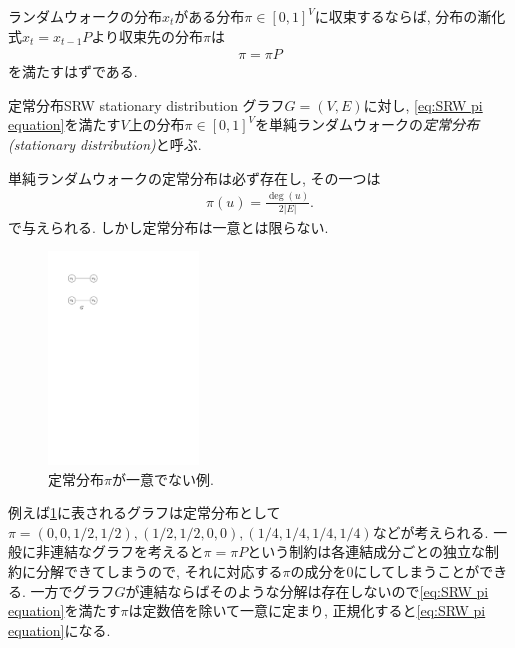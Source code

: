 ランダムウォークの分布$x_t$がある分布$\pi\in[0,1]^V$に収束するならば, 分布の漸化式$x_t = x_{t-1}P$より収束先の分布$\pi$は
\begin{align}
  \pi = \pi P \label{eq:SRW pi equation}
\end{align}
を満たすはずである.
%
\begin{definition}{定常分布}{SRW stationary distribution}
  グラフ$G=(V,E)$に対し, \cref{eq:SRW pi equation}を満たす$V$上の分布$\pi\in[0,1]^V$を単純ランダムウォークの\emph{定常分布 (stationary distribution)}と呼ぶ.
\end{definition}
%
単純ランダムウォークの定常分布は必ず存在し, その一つは
\begin{align}
  \pi(u) = \frac{\deg(u)}{2|E|}. \label{eq:SRW stationary distribution}
\end{align}
で与えられる.
しかし定常分布は一意とは限らない.
\begin{figure}
  \begin{center}
  \includegraphics[width=4cm]{images/graph1.pdf}
  \caption{定常分布$\pi$が一意でない例.  \label{fig:graph1}}
  \end{center}
\end{figure}
例えば\cref{fig:graph1}に表されるグラフは定常分布として$\pi=(0,0,1/2,1/2),(1/2,1/2,0,0),(1/4,1/4,1/4,1/4)$などが考えられる.
一般に非連結なグラフを考えると$\pi = \pi P$という制約は各連結成分ごとの独立な制約に分解できてしまうので, それに対応する$\pi$の成分を$0$にしてしまうことができる.
一方でグラフ$G$が連結ならばそのような分解は存在しないので\cref{eq:SRW pi equation}を満たす$\pi$は定数倍を除いて一意に定まり, 正規化すると\cref{eq:SRW pi equation}になる.

